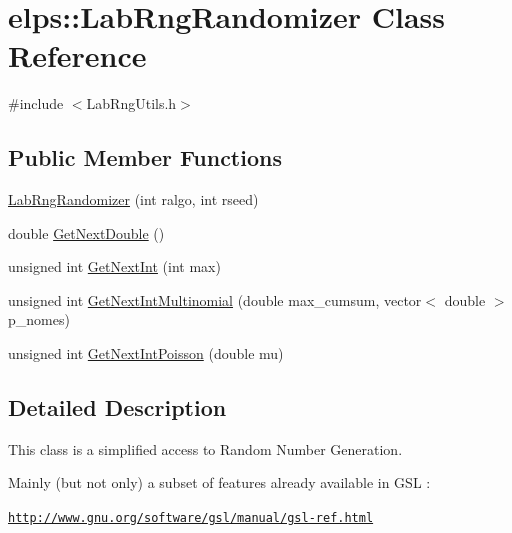 \hypertarget{classelps_1_1_lab_rng_randomizer}{\section{elps\-:\-:Lab\-Rng\-Randomizer Class Reference}
\label{classelps_1_1_lab_rng_randomizer}
}


{\ttfamily \#include $<$Lab\-Rng\-Utils.\-h$>$}

\subsection*{Public Member Functions}
\begin{DoxyCompactItemize}
\item 
\hyperlink{classelps_1_1_lab_rng_randomizer_a472ee9eafa49f5759f1ff43f7c38f572}{Lab\-Rng\-Randomizer} (int ralgo, int rseed)
\item 
double \hyperlink{classelps_1_1_lab_rng_randomizer_ad24feac62dadf0fc3489e800d128678e}{Get\-Next\-Double} ()
\item 
unsigned int \hyperlink{classelps_1_1_lab_rng_randomizer_adfdc07b3e50a861dfca23f85d02b19c8}{Get\-Next\-Int} (int max)
\item 
unsigned int \hyperlink{classelps_1_1_lab_rng_randomizer_a3d3c89465e7c3122986db1042c309e5c}{Get\-Next\-Int\-Multinomial} (double max\-\_\-cumsum, vector$<$ double $>$ p\-\_\-nomes)
\item 
unsigned int \hyperlink{classelps_1_1_lab_rng_randomizer_ae10fff40166b80f6cc7e3459ee26d029}{Get\-Next\-Int\-Poisson} (double mu)
\end{DoxyCompactItemize}


\subsection{Detailed Description}
This class is a simplified access to Random Number Generation.\par
 Mainly (but not only) a subset of features already available in G\-S\-L \-:\par
 \href{http://www.gnu.org/software/gsl/manual/gsl-ref.html}{\tt http\-://www.\-gnu.\-org/software/gsl/manual/gsl-\/ref.\-html} 

